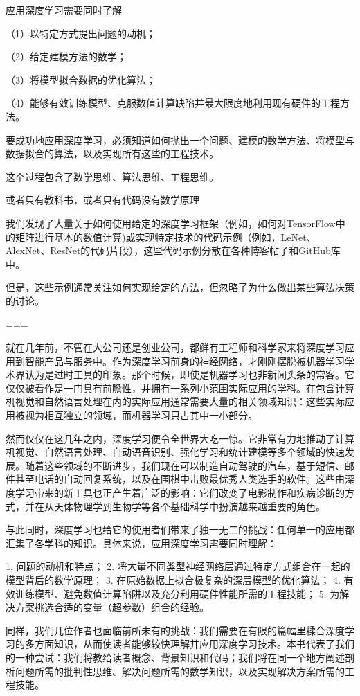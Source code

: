应用深度学习需要同时了解

（1）以特定方式提出问题的动机；

（2）给定建模方法的数学；

（3）将模型拟合数据的优化算法；

（4）能够有效训练模型、克服数值计算缺陷并最大限度地利用现有硬件的工程方法。

要成功地应用深度学习，必须知道如何抛出一个问题、建模的数学方法、将模型与数据拟合的算法，以及实现所有这些的工程技术。

这个过程包含了数学思维、算法思维、工程思维。



或者只有教科书，或者只有代码没有数学原理

我们发现了大量关于如何使用给定的深度学习框架（例如，如何对TensorFlow中的矩阵进行基本的数值计算)或实现特定技术的代码示例（例如，LeNet、AlexNet、ResNet的代码片段），这些代码示例分散在各种博客帖子和GitHub库中。

但是，这些示例通常关注如何实现给定的方法，但忽略了为什么做出某些算法决策的讨论。

===

就在几年前，不管在大公司还是创业公司，都鲜有工程师和科学家来将深度学习应用到智能产品与服务中。作为深度学习前身的神经网络，才刚刚摆脱被机器学习学术界认为是过时工具的印象。那个时候，即使是机器学习也非新闻头条的常客。它仅仅被看作是一门具有前瞻性，并拥有一系列小范围实际应用的学科。在包含计算机视觉和自然语言处理在内的实际应用通常需要大量的相关领域知识：这些实际应用被视为相互独立的领域，而机器学习只占其中一小部分。

然而仅仅在这几年之内，深度学习便令全世界大吃一惊。它非常有力地推动了计算机视觉、自然语言处理、自动语音识别、强化学习和统计建模等多个领域的快速发展。随着这些领域的不断进步，我们现在可以制造自动驾驶的汽车，基于短信、邮件甚至电话的自动回复系统，以及在围棋中击败最优秀人类选手的软件。这些由深度学习带来的新工具也正产生着广泛的影响：它们改变了电影制作和疾病诊断的方式，并在从天体物理学到生物学等各个基础科学中扮演越来越重要的角色。

与此同时，深度学习也给它的使用者们带来了独一无二的挑战：任何单一的应用都汇集了各学科的知识。具体来说，应用深度学习需要同时理解：

1. 问题的动机和特点；
2. 将大量不同类型神经网络层通过特定方式组合在一起的模型背后的数学原理；
3. 在原始数据上拟合极复杂的深层模型的优化算法；
4. 有效训练模型、避免数值计算陷阱以及充分利用硬件性能所需的工程技能；
5. 为解决方案挑选合适的变量（超参数）组合的经验。

同样，我们几位作者也面临前所未有的挑战：我们需要在有限的篇幅里糅合深度学习的多方面知识，从而使读者能够较快理解并应用深度学习技术。本书代表了我们的一种尝试：我们将教给读者概念、背景知识和代码；我们将在同一个地方阐述剖析问题所需的批判性思维、解决问题所需的数学知识，以及实现解决方案所需的工程技能。

